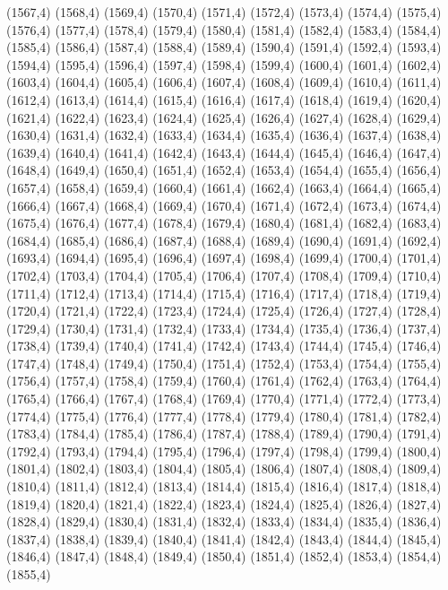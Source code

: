 (1567,4)
(1568,4)
(1569,4)
(1570,4)
(1571,4)
(1572,4)
(1573,4)
(1574,4)
(1575,4)
(1576,4)
(1577,4)
(1578,4)
(1579,4)
(1580,4)
(1581,4)
(1582,4)
(1583,4)
(1584,4)
(1585,4)
(1586,4)
(1587,4)
(1588,4)
(1589,4)
(1590,4)
(1591,4)
(1592,4)
(1593,4)
(1594,4)
(1595,4)
(1596,4)
(1597,4)
(1598,4)
(1599,4)
(1600,4)
(1601,4)
(1602,4)
(1603,4)
(1604,4)
(1605,4)
(1606,4)
(1607,4)
(1608,4)
(1609,4)
(1610,4)
(1611,4)
(1612,4)
(1613,4)
(1614,4)
(1615,4)
(1616,4)
(1617,4)
(1618,4)
(1619,4)
(1620,4)
(1621,4)
(1622,4)
(1623,4)
(1624,4)
(1625,4)
(1626,4)
(1627,4)
(1628,4)
(1629,4)
(1630,4)
(1631,4)
(1632,4)
(1633,4)
(1634,4)
(1635,4)
(1636,4)
(1637,4)
(1638,4)
(1639,4)
(1640,4)
(1641,4)
(1642,4)
(1643,4)
(1644,4)
(1645,4)
(1646,4)
(1647,4)
(1648,4)
(1649,4)
(1650,4)
(1651,4)
(1652,4)
(1653,4)
(1654,4)
(1655,4)
(1656,4)
(1657,4)
(1658,4)
(1659,4)
(1660,4)
(1661,4)
(1662,4)
(1663,4)
(1664,4)
(1665,4)
(1666,4)
(1667,4)
(1668,4)
(1669,4)
(1670,4)
(1671,4)
(1672,4)
(1673,4)
(1674,4)
(1675,4)
(1676,4)
(1677,4)
(1678,4)
(1679,4)
(1680,4)
(1681,4)
(1682,4)
(1683,4)
(1684,4)
(1685,4)
(1686,4)
(1687,4)
(1688,4)
(1689,4)
(1690,4)
(1691,4)
(1692,4)
(1693,4)
(1694,4)
(1695,4)
(1696,4)
(1697,4)
(1698,4)
(1699,4)
(1700,4)
(1701,4)
(1702,4)
(1703,4)
(1704,4)
(1705,4)
(1706,4)
(1707,4)
(1708,4)
(1709,4)
(1710,4)
(1711,4)
(1712,4)
(1713,4)
(1714,4)
(1715,4)
(1716,4)
(1717,4)
(1718,4)
(1719,4)
(1720,4)
(1721,4)
(1722,4)
(1723,4)
(1724,4)
(1725,4)
(1726,4)
(1727,4)
(1728,4)
(1729,4)
(1730,4)
(1731,4)
(1732,4)
(1733,4)
(1734,4)
(1735,4)
(1736,4)
(1737,4)
(1738,4)
(1739,4)
(1740,4)
(1741,4)
(1742,4)
(1743,4)
(1744,4)
(1745,4)
(1746,4)
(1747,4)
(1748,4)
(1749,4)
(1750,4)
(1751,4)
(1752,4)
(1753,4)
(1754,4)
(1755,4)
(1756,4)
(1757,4)
(1758,4)
(1759,4)
(1760,4)
(1761,4)
(1762,4)
(1763,4)
(1764,4)
(1765,4)
(1766,4)
(1767,4)
(1768,4)
(1769,4)
(1770,4)
(1771,4)
(1772,4)
(1773,4)
(1774,4)
(1775,4)
(1776,4)
(1777,4)
(1778,4)
(1779,4)
(1780,4)
(1781,4)
(1782,4)
(1783,4)
(1784,4)
(1785,4)
(1786,4)
(1787,4)
(1788,4)
(1789,4)
(1790,4)
(1791,4)
(1792,4)
(1793,4)
(1794,4)
(1795,4)
(1796,4)
(1797,4)
(1798,4)
(1799,4)
(1800,4)
(1801,4)
(1802,4)
(1803,4)
(1804,4)
(1805,4)
(1806,4)
(1807,4)
(1808,4)
(1809,4)
(1810,4)
(1811,4)
(1812,4)
(1813,4)
(1814,4)
(1815,4)
(1816,4)
(1817,4)
(1818,4)
(1819,4)
(1820,4)
(1821,4)
(1822,4)
(1823,4)
(1824,4)
(1825,4)
(1826,4)
(1827,4)
(1828,4)
(1829,4)
(1830,4)
(1831,4)
(1832,4)
(1833,4)
(1834,4)
(1835,4)
(1836,4)
(1837,4)
(1838,4)
(1839,4)
(1840,4)
(1841,4)
(1842,4)
(1843,4)
(1844,4)
(1845,4)
(1846,4)
(1847,4)
(1848,4)
(1849,4)
(1850,4)
(1851,4)
(1852,4)
(1853,4)
(1854,4)
(1855,4)
